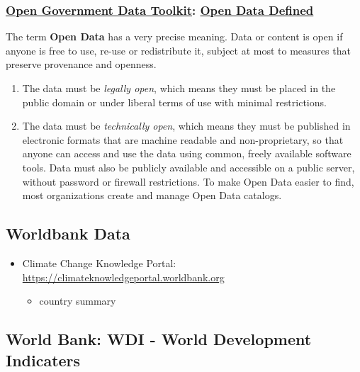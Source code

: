 \documentclass[
]{bxjsbook}
\providecommand{\tightlist}{%
  \setlength{\itemsep}{0pt}\setlength{\parskip}{0pt}}
\theoremstyle{definition}
\theoremstyle{definition}
\theoremstyle{definition}
\theoremstyle{definition}
\theoremstyle{remark}
\begin{document}
\hypertarget{open-government-data-toolkit-open-data-defined}{%
\subsubsection{\texorpdfstring{\href{http://opendatatoolkit.worldbank.org}{Open Government Data Toolkit}: \href{http://opendatatoolkit.worldbank.org/en/essentials.html}{Open Data Defined}}{Open Government Data Toolkit: Open Data Defined}}\label{open-government-data-toolkit-open-data-defined}}

The term \textbf{Open Data} has a very precise meaning. Data or content is open if anyone is free to use, re-use or redistribute it, subject at most to measures that preserve provenance and openness.

\begin{enumerate}
\def\labelenumi{\arabic{enumi}.}
\tightlist
\item
  The data must be \emph{legally open}, which means they must be placed in the public domain or under liberal terms of use with minimal restrictions.
\item
  The data must be \emph{technically open}, which means they must be published in electronic formats that are machine readable and non-proprietary, so that anyone can access and use the data using common, freely available software tools. Data must also be publicly available and accessible on a public server, without password or firewall restrictions. To make Open Data easier to find, most organizations create and manage Open Data catalogs.
\end{enumerate}

\hypertarget{worldbank-data}{%
\subsection{Worldbank Data}\label{worldbank-data}}

\begin{itemize}
\tightlist
\item
  Climate Change Knowledge Portal: \url{https://climateknowledgeportal.worldbank.org}

  \begin{itemize}
  \tightlist
  \item
    country summary
  \end{itemize}
\end{itemize}

\hypertarget{world-bank-wdi---world-development-indicaters}{%
\subsection{World Bank: WDI - World Development Indicaters}\label{world-bank-wdi---world-development-indicaters}}
\end{document}
